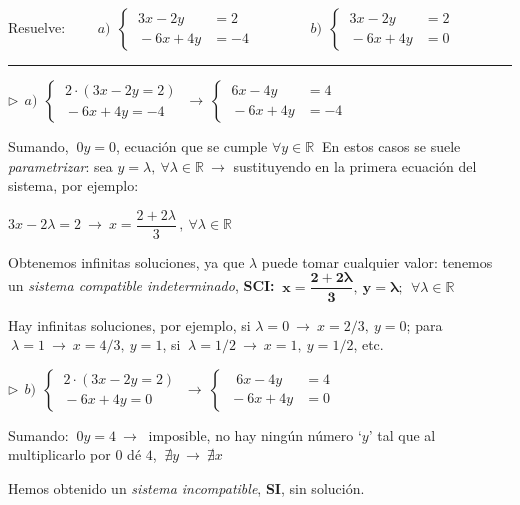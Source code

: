 \begin{miejercicio}

	Resuelve: $\qquad a)\ \ \begin{cases} \ 3x-2y&=2 \\ \ -6x+4y&=-4 \end{cases} \qquad \qquad  b)\ \ \begin{cases} \ 3x-2y&=2 \\ \  -6x+4y&=0 \end{cases}$	
	
\rule{200pt}{0.1pt}
	
\vspace{2mm}	$\triangleright \ \  a)\ \ \begin{cases} \ 2\cdot (3x-2y=2) \\ \ -6x+4y=-4 \end{cases} \ \to \ \begin{cases} \ 6x-4y&=4 \\ \ -6x+4y&=-4 \end{cases}\ \ $ 

\vspace{2mm} Sumando, $\ 0y=0$, ecuación que se cumple $\forall y \in \mathbb R \ $ En estos casos se suele \emph{parametrizar}: sea $y=\lambda,\ \forall \lambda \in \mathbb R \ \to $ sustituyendo en la primera ecuación del sistema, por ejemplo:

\vspace{2mm} $3x-2\lambda=2 \ \to \ x=\dfrac{2+2\lambda}{3}\, ,\ \forall \lambda \in \mathbb R $

\vspace{2mm} Obtenemos infinitas soluciones, ya que $ \lambda $ puede tomar cualquier valor: tenemos un \emph{sistema compatible indeterminado}, \textbf{SCI:} $\ \boldsymbol {x=\dfrac{2+2\lambda}{3},\ y=\lambda;\ } \ \forall \lambda \in \mathbb R$

\vspace{2mm} Hay infinitas soluciones, por ejemplo, si $\lambda=0 \ \to \ x=2/3,\ y=0$; para $\ \lambda=1 \ \to \  x=4/3,\ y=1$, si $\ \lambda=1/2 \ \to \ x=1,\ y=1/2$, etc.
	
\vspace{7mm}	$\triangleright \ \ b)\ \ \begin{cases} \ 2\cdot(3x-2y=2) \\ \  -6x+4y=0 \end{cases} \ \to \ \begin{cases} \ \ \ 6x-4y&=4 \\ \ -6x+4y&=0 \end{cases}\ \ $

\vspace{2mm} Sumando: $\ 0y=4 \ \to \ $ imposible, no hay ningún número `$y$' tal que al multiplicarlo por $0$ dé $4$, $\ \nexists y \ \to \ \nexists x$

\vspace{2mm} Hemos obtenido un \emph{sistema incompatible}, \textbf{SI}, sin solución.
\end{miejercicio}

